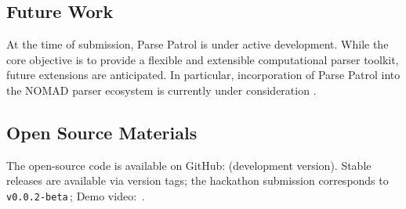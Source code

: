 \subsection*{Future Work}

At the time of submission, Parse Patrol is under active development. While the core objective is to provide a flexible and extensible computational parser toolkit, future extensions are anticipated. In particular, incorporation of Parse Patrol into the NOMAD parser ecosystem is currently under consideration \cite{nomad_lab, draxl2019nomad}.


\subsection*{Open Source Materials}

The open-source code is available on GitHub:  
 (development version). Stable releases are available via version tags; the hackathon submission corresponds to \texttt{v0.0.2-beta}\,; Demo video:  
\,.





